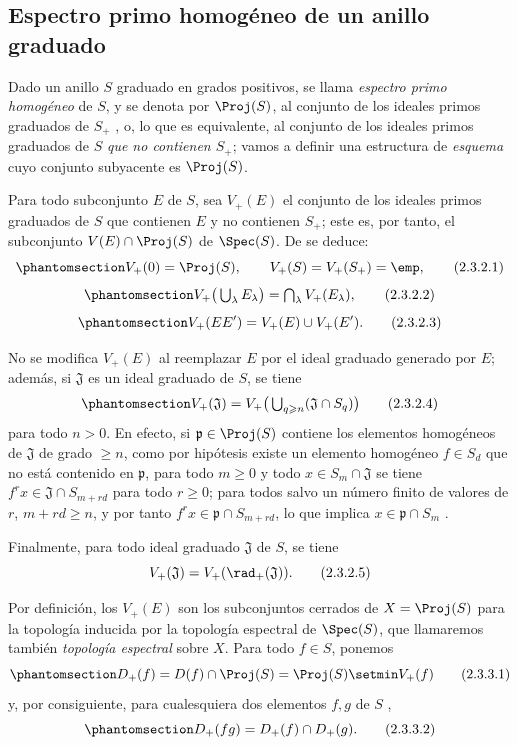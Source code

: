 \documentclass[oneside,10pt]{amsart}
\renewcommand{\geq}{\geqslant}
\newcommand{\oldpage}[2][]{\marginnote{\normalfont\footnotesize\textbf{#1}~|~#2}\ignorespaces}
\let\EGAOriginalLabel\label
\renewcommand{\label}[1]{\phantomsection\EGAOriginalLabel{#1}}
\begin{document}
\subsection{Espectro primo homogéneo de un anillo graduado}
\label{subsection:II.2.3}

\begin{env}[2.3.1]
\label{II.2.3.1}
Dado un anillo $S$ graduado en grados positivos, se llama \emph{espectro primo homogéneo} de $S$, y se denota por $\Proj(S)$, al conjunto de los ideales primos graduados de $S_+$ , o, lo que es equivalente, al conjunto de los ideales primos graduados de $S$ \emph{que no contienen $S_+$}; vamos a definir una estructura de \emph{esquema} cuyo conjunto subyacente es $\Proj(S)$.
\end{env}

\begin{env}[2.3.2]
\label{II.2.3.2}
Para todo subconjunto $E$ de $S$, sea $V_+(E)$ el conjunto de los ideales primos graduados de $S$ que contienen $E$ y no contienen $S_+$; este es, por tanto, el subconjunto $V(E)\cap\Proj(S)$ de $\Spec(S)$.
De  se deduce:
\[
\label{II.2.3.2.1}
  V_+(0)=\Proj(S),\qquad V_+(S)=V_+(S_+)=\emp,
\tag{2.3.2.1}
\]
\[
\label{II.2.3.2.2}
  V_+\big(\textstyle\bigcup_\lambda E_\lambda\big)
  =\textstyle\bigcap_\lambda V_+(E_\lambda),
\tag{2.3.2.2}
\]
\[
\label{II.2.3.2.3}
  V_+(EE')=V_+(E)\cup V_+(E').
\tag{2.3.2.3}
\]

No se modifica $V_+(E)$ al reemplazar $E$ por el ideal graduado generado por $E$; además, si $\mathfrak{J}$ es un ideal graduado de $S$, se tiene
\[
\label{II.2.3.2.4}
  V_+(\mathfrak{J})
  =V_+\big(\textstyle\bigcup_{q\geq n}(\mathfrak{J}\cap S_q)\big)
\tag{2.3.2.4}
\]
\oldpage[II]{26}
para todo $n>0$.
En efecto, si $\mathfrak{p}\in\Proj(S)$ contiene los elementos homogéneos de $\mathfrak{J}$ de grado $\geq n$, como por hipótesis existe un elemento homogéneo $f\in S_d$ que no está contenido en $\mathfrak{p}$, para todo $m\geq0$ y todo $x\in S_m\cap\mathfrak{J}$ se tiene $f^rx\in\mathfrak{J}\cap S_{m+rd}$ para todo $r\geq0$; para todos salvo un número finito de valores de $r$, $m+rd\geq n$, y por tanto $f^rx\in\mathfrak{p}\cap S_{m+rd}$, lo que implica $x\in\mathfrak{p}\cap S_m$ .

Finalmente, para todo ideal graduado $\mathfrak{J}$ de $S$, se tiene
\[
  V_+(\mathfrak{J})=V_+(\rad_+(\mathfrak{J})).
\tag{2.3.2.5}
\]
\end{env}

\begin{env}[2.3.3]
\label{II.2.3.3}
Por definición, los $V_+(E)$ son los subconjuntos cerrados de $X=\Proj(S)$ para la topología inducida por la topología espectral de $\Spec(S)$, que llamaremos también \emph{topología espectral} sobre $X$.
Para todo $f\in S$, ponemos
\[
\label{II.2.3.3.1}
  D_+(f)=D(f)\cap\Proj(S)=\Proj(S)\setmin V_+(f)
\tag{2.3.3.1}
\]
y, por consiguiente, para cualesquiera dos elementos $f,g$ de $S$ ,
\[
\label{II.2.3.3.2}
  D_+(fg)=D_+(f)\cap D_+(g).
\tag{2.3.3.2}
\]
\end{env}
\end{document}

